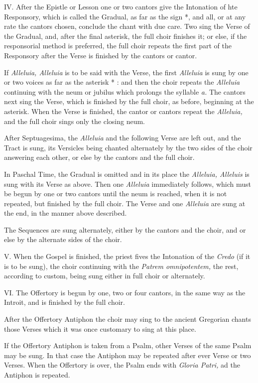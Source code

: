 IV. \quad After the Epistle or Lesson one or two cantors give the Intonation of hte Responsory, which is called the Gradual, as far as the sign *, and all, or at any rate the cantors chosen, conclude the chant with due care. Two sing the Verse of the Gradual, and, after the final asterisk, the full choir finishes it; or else, if the responsorial method is preferred, the full choir repeats the first part of the Responsory after the Verse is finished by the cantors or cantor.

If {\it Alleluia, Alleluia} is to be said with the Verse, the first {\it Alleluia} is sung by one or two voices as far as the asterisk * : and then the choir repeats the {\it Alleluia} continuing with the neum or jubilus which prolongs the syllable {\it a.} The cantors next sing the Verse, which is finished by the full choir, as before, beginning at the asterisk. When the Verse is finished, the cantor or cantors repeat the {\it Alleluia,} and the full choir sings only the closing neum.

After Septuagesima, the {\it Alleluia} and the following Verse are left out, and the Tract is sung, its Versicles being chanted alternately by the two sides of the choir answering each other, or else by the cantors and the full choir.

In Paschal Time, the Gradual is omitted and in its place the {\it Alleluia, Alleluis} is sung with its Verse as above. Then one {\it Alleluia} immediately follows, which must be begun by one or two cantors until the neum is reached, when it is not repeated, but finished by the full choir. The Verse and one {\it Alleluia} are sung at the end, in the manner above described.

The Sequences are sung alternately, either by the cantors and the choir, and or else by the alternate sides of the choir.

V. \quad When the Gospel is finished, the priest fives the Intonation of the {\it Credo} (if it is to be sung), the choir continuing with the {\it Patrem omnipotentem,} the rest, according to custom, being sung either in full choir or alternately.

VI. \quad The Offertory is begun by one, two or four cantors, in the same way as the Introit, and is finished by the full choir.

After the Offertory Antiphon the choir may sing to the ancient Gregorian chants those Verses which it was once customary to sing at this place.

If the Offertory Antiphon is taken from a Psalm, other Verses of the same Psalm may be sung. In that case the Antiphon may be repeated after ever Verse or two Verses. When the Offertory is over, the Psalm ends with {\it Gloria Patri,} ad the Antiphon is repeated.

